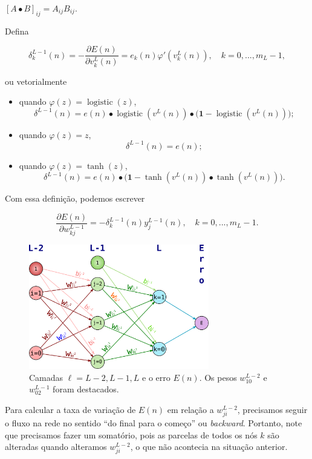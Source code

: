 \documentclass[12pt,a4paper]{article}
\DeclareMathOperator{\logistic}{logistic}
\begin{document}
$
[A\bullet B]_{ij} = A_{ij}B_{ij}.
$



Defina

\begin{equation}\label{delta-1}
\delta^{L-1}_k(n) = -\dfrac{\partial E(n)}{\partial v^L_k(n)} = e_k(n) \varphi'(v_k^L(n))  
, \quad k=0,...,m_L-1,
\end{equation}

ou vetorialmente

\begin{itemize}\color{purple}
\item quando $\varphi(z)=\logistic(z)$,
\[
\delta^{L-1}(n) = e(n)\bullet \logistic(v^L(n))\bullet \Big(\mathbf{1}-\logistic(v^{L}(n))\Big);
\]
\item quando $\varphi(z)=z$,
\[
\delta^{L-1}(n) = e(n);
\]
\item quando $\varphi(z)=\tanh(z)$,
\[
\delta^{L-1}(n) = e(n)\bullet \Big(\mathbf{1}-\tanh(v^L(n))\bullet \tanh(v^L(n))\Big).
\]
\end{itemize}


Com essa definição, podemos escrever

\begin{equation}
\dfrac{\partial E(n)}{\partial w^{L-1}_{kj}} = -\delta^{L-1}_k(n) y_j^{L-1}(n), \quad k=0,...,m_L-1.
\end{equation}


\begin{figure}[H]\centering
	\label{fig:rede}
\includegraphics[width=0.7\textwidth]{rede}
\caption{Camadas $\ell=L-2,L-1,L$ e o erro $E(n)$. Os pesos $w^{L-2}_{10}$ e $w^{L-1}_{02}$ foram destacados.}
\end{figure}


Para calcular a taxa de variação de $E(n)$ em relação a $w^{L-2}_{ji}$, precisamos seguir o fluxo na rede no sentido ``do final para o começo'' ou \textit{backward}. Portanto, note que precisamos fazer um somatório, pois as parcelas de todos os nós $k$ são alteradas quando alteramos $w^{L-2}_{ji}$, o que não acontecia na situação anterior.  
\end{document}

